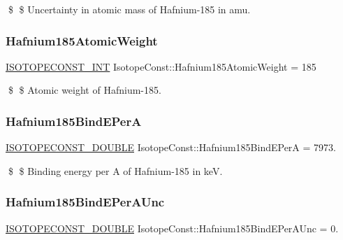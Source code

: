 \$ \$ Uncertainty in atomic mass of Hafnium-\/185 in amu. \mbox{\label{group___isotope_const-_hafnium-_hf185_ga85bb08dce15efb7c131d4c05578f7ba7}} 
\subsubsection{\texorpdfstring{Hafnium185\+Atomic\+Weight}{Hafnium185AtomicWeight}}
{\footnotesize\ttfamily \mbox{\hyperlink{group___isotope_const-_macros_ga5f18360b3e99483a35c32d789e62621c}{I\+S\+O\+T\+O\+P\+E\+C\+O\+N\+S\+T\+\_\+\+I\+NT}} Isotope\+Const\+::\+Hafnium185\+Atomic\+Weight = 185}

\$ \$ Atomic weight of Hafnium-\/185. \mbox{\label{group___isotope_const-_hafnium-_hf185_gaab8ff78f1a33359de3ce2f26d202b3be}} 
\subsubsection{\texorpdfstring{Hafnium185\+Bind\+E\+PerA}{Hafnium185BindEPerA}}
{\footnotesize\ttfamily \mbox{\hyperlink{group___isotope_const-_macros_ga8f45a7272ce02c0b4c65c44636ed719a}{I\+S\+O\+T\+O\+P\+E\+C\+O\+N\+S\+T\+\_\+\+D\+O\+U\+B\+LE}} Isotope\+Const\+::\+Hafnium185\+Bind\+E\+PerA = 7973.}

\$ \$ Binding energy per A of Hafnium-\/185 in keV. \mbox{\label{group___isotope_const-_hafnium-_hf185_gae31439abd974ed6a8ee12f903bd1a91a}} 
\subsubsection{\texorpdfstring{Hafnium185\+Bind\+E\+Per\+A\+Unc}{Hafnium185BindEPerAUnc}}
{\footnotesize\ttfamily \mbox{\hyperlink{group___isotope_const-_macros_ga8f45a7272ce02c0b4c65c44636ed719a}{I\+S\+O\+T\+O\+P\+E\+C\+O\+N\+S\+T\+\_\+\+D\+O\+U\+B\+LE}} Isotope\+Const\+::\+Hafnium185\+Bind\+E\+Per\+A\+Unc = 0.}

